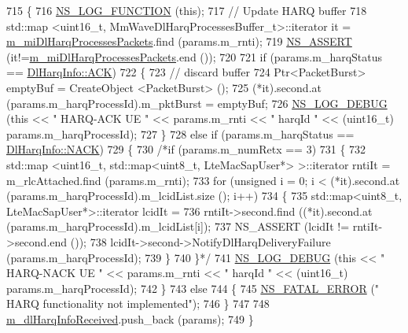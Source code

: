 \begin{DoxyCode}
715 \{
716   \hyperlink{log-macros-disabled_8h_a90b90d5bad1f39cb1b64923ea94c0761}{NS\_LOG\_FUNCTION} (\textcolor{keyword}{this});
717   \textcolor{comment}{// Update HARQ buffer}
718   std::map <uint16\_t, MmWaveDlHarqProcessesBuffer\_t>::iterator it =  
      \hyperlink{classns3_1_1MmWaveEnbMac_aa2508718e6021eb3e796e5aeab6dc219}{m\_miDlHarqProcessesPackets}.find (params.m\_rnti);
719   \hyperlink{assert_8h_a6dccdb0de9b252f60088ce281c49d052}{NS\_ASSERT} (it!=\hyperlink{classns3_1_1MmWaveEnbMac_aa2508718e6021eb3e796e5aeab6dc219}{m\_miDlHarqProcessesPackets}.end ());
720 
721   \textcolor{keywordflow}{if} (params.m\_harqStatus == \hyperlink{structns3_1_1DlHarqInfo_a922d2bc13ae01f93cde1a8b4bfccad14a8d3ab99ad8902cfbc5929336966de3ef}{DlHarqInfo::ACK})
722   \{
723         \textcolor{comment}{// discard buffer}
724         Ptr<PacketBurst> emptyBuf = CreateObject <PacketBurst> ();
725         (*it).second.at (params.m\_harqProcessId).m\_pktBurst = emptyBuf;
726         \hyperlink{group__logging_ga413f1886406d49f59a6a0a89b77b4d0a}{NS\_LOG\_DEBUG} (\textcolor{keyword}{this} << \textcolor{stringliteral}{" HARQ-ACK UE "} << params.m\_rnti << \textcolor{stringliteral}{" harqId "} << (uint16\_t)
      params.m\_harqProcessId);
727   \}
728   \textcolor{keywordflow}{else} \textcolor{keywordflow}{if} (params.m\_harqStatus == \hyperlink{structns3_1_1DlHarqInfo_a922d2bc13ae01f93cde1a8b4bfccad14ae0560b883a5e22a4d4c40ac562e80374}{DlHarqInfo::NACK})
729   \{
730         \textcolor{comment}{/*if (params.m\_numRetx == 3)}
731 \textcolor{comment}{        \{}
732 \textcolor{comment}{                std::map <uint16\_t, std::map<uint8\_t, LteMacSapUser*> >::iterator rntiIt =
       m\_rlcAttached.find (params.m\_rnti);}
733 \textcolor{comment}{                for (unsigned i = 0; i < (*it).second.at (params.m\_harqProcessId).m\_lcidList.size (); i++)}
734 \textcolor{comment}{                \{}
735 \textcolor{comment}{                                std::map<uint8\_t, LteMacSapUser*>::iterator lcidIt =}
736 \textcolor{comment}{                                                rntiIt->second.find ((*it).second.at
       (params.m\_harqProcessId).m\_lcidList[i]);}
737 \textcolor{comment}{                                NS\_ASSERT (lcidIt != rntiIt->second.end ());}
738 \textcolor{comment}{                                lcidIt->second->NotifyDlHarqDeliveryFailure (params.m\_harqProcessId);}
739 \textcolor{comment}{                \}}
740 \textcolor{comment}{        \}*/}
741         \hyperlink{group__logging_ga413f1886406d49f59a6a0a89b77b4d0a}{NS\_LOG\_DEBUG} (\textcolor{keyword}{this} << \textcolor{stringliteral}{" HARQ-NACK UE "} << params.m\_rnti << \textcolor{stringliteral}{" harqId "} << (uint16\_t)
      params.m\_harqProcessId);
742   \}
743   \textcolor{keywordflow}{else}
744   \{
745         \hyperlink{group__fatal_ga5131d5e3f75d7d4cbfd706ac456fdc85}{NS\_FATAL\_ERROR} (\textcolor{stringliteral}{" HARQ functionality not implemented"});
746   \}
747 
748   \hyperlink{classns3_1_1MmWaveEnbMac_accfe25fdd9a18c09dd39a062e02370e5}{m\_dlHarqInfoReceived}.push\_back (params);
749 \}
\end{DoxyCode}


